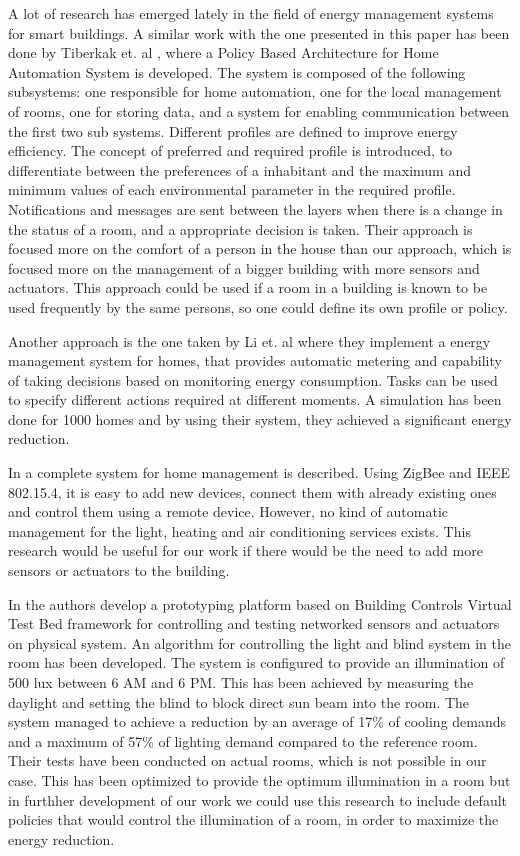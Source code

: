 \label{chap:relatedwork}
A lot of research has emerged lately in the field of energy management systems for smart buildings. 
A similar work with the one presented in this paper has been done by Tiberkak et. al \cite{Tiberkak10}, where a Policy Based Architecture for Home Automation
System is developed. The system is composed of the following subsystems: one responsible
for home automation, one for the local management of rooms, one for storing data, and a system for enabling communication between the first two sub systems. Different profiles are defined to improve energy efficiency.
The concept of preferred and required profile is introduced, to differentiate between the preferences of a inhabitant and the maximum and minimum values of each environmental parameter in the required profile. Notifications
and messages are sent between the layers when there is a change in the status of a room, and a appropriate decision is taken. Their approach is focused more on the comfort of a person in the house than our approach, which is focused more on the management of a bigger building with more sensors and actuators. This approach could be used if a room in a building is known to be used frequently by the same persons, so one could define its own profile or policy. 

Another approach is the one taken by Li et. al \cite{Li11} where they implement a energy management system for homes, that provides automatic metering and capability of taking decisions based on monitoring energy consumption. 
Tasks can be used to specify different actions required at different moments. A simulation has been done for 1000 homes and by using their system, they achieved a significant energy reduction.

In \cite{Han10} a complete system for home management is described. Using ZigBee and IEEE 802.15.4, it is easy to add new devices, connect them with already existing ones and control them using a remote device. However, no kind of automatic management for the light, heating and air conditioning services exists. This research would be useful for our work if there would be the need to add more sensors or actuators to the building.

In \cite{Wen11} the authors develop a prototyping platform based on Building Controls Virtual Test Bed framework \cite{Bcvtb} for controlling and testing networked sensors and actuators on physical system. An algorithm for controlling the light and blind system in the room has been developed. The system is configured to provide an illumination of 500 lux between 6 AM and 6 PM. This has been achieved by measuring the daylight and setting the blind to block direct sun beam into the room. The system managed to achieve a reduction by an average of 17\% of cooling demands and a maximum of 57\% of lighting demand compared to the reference room. Their tests have been conducted on actual rooms, which is not possible in our case. This has been optimized to provide the optimum illumination in a room but in furthher development of our work we could use this research to include default policies that would control the illumination of a room, in order to maximize the energy reduction. 

